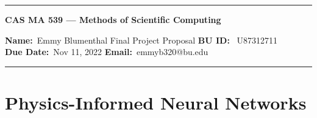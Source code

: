 \documentclass[10pt]{article}
\newcommand{\1}{\mathbf 1}
\begin{document}
\begin{center}
	\hrule
	\vspace{.4cm}
	{\textbf { \large CAS MA 539 --- Methods of Scientific Computing}}
\end{center}
\textbf{Name:}\ Emmy Blumenthal \hspace{\fill} Final Project Proposal\hspace{\fill}  \textbf{BU ID:} \ U87312711 \\
\textbf{Due Date:}\  Nov 11, 2022   \hspace{\fill} \textbf{Email:}\ emmyb320@bu.edu \ 
\vspace{.4cm}
\hrule

\section*{Physics-Informed Neural Networks}
\end{document}
